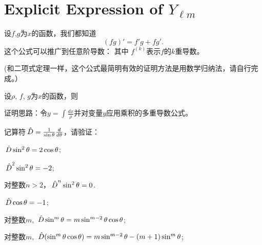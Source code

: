 \documentclass[CJK]{beamer}
\begin{document}
\section{Explicit Expression of $Y_{\ell m}$}

\begin{frame}
  \bch
  设$f$,$g$为$x$的函数，我们都知道
  $$ (fg)' = f'g + fg'. $$
  这个公式可以推广到任意阶导数：
  其中 $f^{(k)}$表示$f$的$k$重导数。

  \skipline
  {\small \darkgreen (和二项式定理一样，这个公式最简明有效的证明方法是用数学归纳法，请自行完成。）}
  \ech
\end{frame}


\begin{frame}
  \bch
  设$\rho$, $f$, $g$为$x$的函数，则

  \skipline
  
  {\small \darkgreen 证明思路：令$y = \int \frac{dx}{\rho}$并对变量$y$应用乘积的多重导数公式。}
  
  \ech
\end{frame}


\begin{frame}
\bch
记算符${\,\hat{D}} = \frac{1}{\sin\theta}\frac{d}{d\theta}$，请验证：
\bitem
\item{${\,\hat{D}}\sin^2\theta = 2\cos\theta$;}
\item{${\,\hat{D}}^2\sin^2\theta = -2$;}
\item{对整数$n>2$，${\,\hat{D}}^n \sin^2\theta = 0$.}  
\item{${\,\hat{D}}\cos\theta = -1$;}
\item{对整数$m$, ${\,\hat{D}} \sin^m\theta = m \sin^{m-2}\theta \cos\theta$;}
\item{对整数$m$, ${\,\hat{D}} (\sin^m\theta\cos\theta) =m\sin^{m-2}\theta - (m+1)\sin^m\theta$;}  
\eitem
  
\ech
\end{frame}
\end{document}
